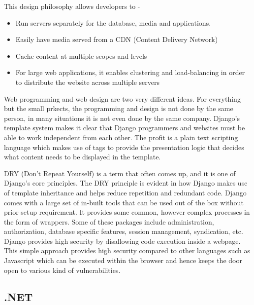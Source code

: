 \documentclass[../thesis.tex]{subfiles}
\begin{document}
This design philosophy allows developers to - 
\begin{itemize}
	\item  Run servers separately for the database, media and applications.
	\newline
    
	\item  Easily have media served from a CDN (Content Delivery Network)
	\newline
    
	\item  Cache content at multiple scopes and levels
	\newline
    
	\item  For large web applications, it enables clustering and load-balancing in order to distribute the website across multiple servers
    
\end{itemize}
Web programming and web design are two very different ideas. For everything but the small prkects, the programming and design is not done by the same person, in many situations it is not even done by the same company. Django's template system makes it clear that Django programmers and websites must be able to work independent from each other. The profit is a plain text scripting language which makes use of tags to provide the presentation logic that decides what content needs to be displayed in the template.

DRY (Don't Repeat Yourself) is a term that often comes up, and it is one of Django's core principles. The DRY principle is evident in how Django makes use of template inheritance and helps reduce repetition and redundant code. Django comes with a large set of in-built tools that can be used out of the box without prior setup requirement. It provides some common, however complex processes in the form of wrappers. Some of these packages include administration, authorization, database specific features, session management, syndication, etc.
Django provides high security by disallowing code execution inside a webpage. This simple approach provides high security compared to other languages such as Javascript which can be executed within the browser and hence keeps the door open to various kind of vulnerabilities.



\subsection{.NET}
    
\end{document}
